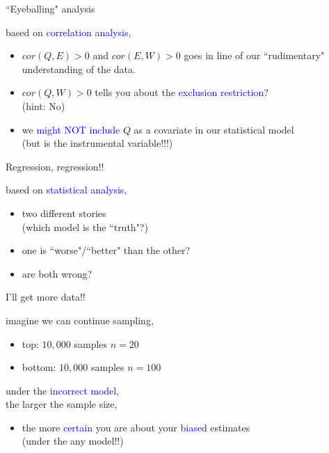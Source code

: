 %
%
\begin{lhframe}[rhgraphic={\texttt{[image: pipefork1\_panel.pdf]}}]
	{``Eyeballing" analysis}
	
	based on \textcolor{blue}{correlation analysis},
	\begin{itemize}
		\item $cor(Q, E)>0$ and $cor(E, W)>0$ goes in line of our ``rudimentary" understanding of the data.
		\item $cor(Q, W)>0$ tells you about the \textcolor{blue}{exclusion restriction}? \\
		{\small (hint: No)}
		\item we \textcolor{blue}{might NOT include} $Q$ as a covariate in our statistical model \\
		{\small (but is the instrumental variable!!!)}
	\end{itemize}
\end{lhframe}
%
%
\begin{lhframe}[rhgraphic={\texttt{[image: pipefork1\_reg.png]}}]
	{Regression, regression!!}
	
	based on \textcolor{blue}{statistical analysis},
	\begin{itemize}
		\item two different stories \\
		{\small (which model is the ``truth"?) }
		\item one is ``worse"/``better" than the other?
		\item are both wrong?
	\end{itemize}
\end{lhframe}
%
%
\begin{lhframe}[rhgraphic={\texttt{[image: pipefork1\_samplesize.pdf]}}]
	{I'll get more data!!}
	
	imagine we can continue sampling,
	\begin{itemize}
		\item top: $10,000$ samples $n=20$
		\item bottom: $10,000$ samples $n=100$
	\end{itemize}
	
	under the \textcolor{blue}{incorrect model}, \\
	the larger the sample size,
	\begin{itemize}
		\item the more \textcolor{blue}{certain} you are about your \textcolor{blue}{biased} estimates \\
		{\small (under the any model!!)}
	\end{itemize}
\end{lhframe}
